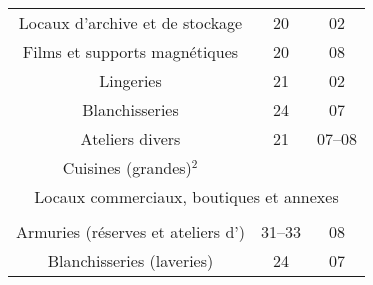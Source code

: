\begin{minipage}[t]{0.49\linewidth}
\begin{tabularx}{\textwidth}[t]{c X c c}
\multicolumn{2}{p{4.8cm}}{Locaux d'archive et de stockage}												&	20			&	02 \\	
\multicolumn{2}{p{4.8cm}}{Films et supports magnétiques}												&	20			&	08 \\	
\multicolumn{2}{p{4.8cm}}{Lingeries}																				&	21			&	02 \\	
\multicolumn{2}{p{4.8cm}}{Blanchisseries}																			&	24			&	07 \\	
\multicolumn{2}{p{4.8cm}}{Ateliers divers}																			&	21			&	07--08 \\	
\multicolumn{2}{p{4.8cm}}{Cuisines (grandes)$^2$}													&				& \\
\midrule
\multicolumn{4}{p{0.95\textwidth}}{Locaux commerciaux, boutiques et annexes} \\
\middashrule \\
\multicolumn{2}{p{4.8cm}}{Armuries (réserves et ateliers d')}												&	31--33			&	08 \\	
\multicolumn{2}{p{4.8cm}}{Blanchisseries (laveries)}															&	24					&	07 \\
\end{tabularx}
\end{minipage}
\hfill
